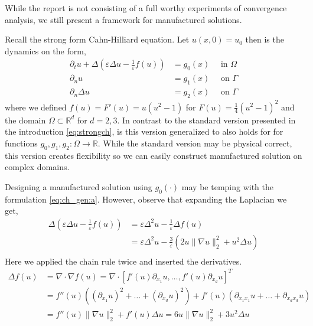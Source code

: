 While the report is not consisting of a full worthy experiments of convergence analysis, we still present a framework for manufactured solutions.

Recall the strong form Cahn-Hilliard equation. Let $ u( x,0) =  u_{0}$ then is the dynamics on the form,
\begin{subequations}
    \label{eq:ch_gen}
    \begin{align}
    \label{eq:ch_gen:a}
        \partial _{t} u + \Delta  \left(  \varepsilon  \Delta u - \frac{1}{\varepsilon }f( u) \right)   &= g_{0}( x)   \quad \text{ in } \Omega  \\
        \partial _{n} u &= g_{1}( x)  \quad \text{ on } \Gamma  \\
        \partial _{n}    \Delta u   &= g_{2}(x)  \quad \text{ on } \Gamma
    \end{align}
\end{subequations}
where we defined $f( u) = F'( u) =u( u^2 -1)  $ for $F( u) = \frac{1}{4}( u^{2} - 1)^{2} $ and the domain $\Omega \subset \mathbb{R} ^{d} $  for $d = 2,3$. In contrast to the standard version presented in the introduction \eqref{eq:strongch}, is this version
generalized to also holds for for functions $g_{0},g_{1},g_{2}: \Omega \to\mathbb{R}   $. While the standard version may be physical correct, this version creates flexibility so we can easily construct manufactured solution on complex domains.

    Designing a manufactured solution using $g_{0}( \cdot ) $ may be temping with the formulation \eqref{eq:ch_gen:a}. However, observe that expanding the Laplacian we get,
    \begin{equation}
    \begin{split}
        \Delta  \left(  \varepsilon  \Delta u - \frac{1}{\varepsilon }f( u) \right) & = \varepsilon \Delta^2 u - \frac{1}{\varepsilon } \Delta f( u) \\
                                                                                    &= \varepsilon \Delta ^2 u  - \frac{3}{\varepsilon }( 2u \| \nabla u \|_{ 2 }^{ 2 } + u^{2}  \Delta u )   \\
    \end{split}
    \end{equation}
Here we applied the chain rule twice and inserted the derivatives.
\begin{equation}
    \label{eq:nonlinear_laplace}
    \begin{split}
\Delta f( u)  &= \nabla \cdot \nabla f( u)  = \nabla \cdot  \left[ f' ( u) \partial _{x_{1}}u, \ldots, f' ( u) \partial _{x_{d}}u \right] ^{T} \\
& =  f'' ( u)( ( \partial _{x_{1}}u )^{2} + \ldots +( \partial _{x_{d}}u )^{2} ) +  f' ( u)( \partial _{x_{1} x_{1}}u + \ldots +   \partial _{x_{d} x_{d}}u ) \\
&=  f'' ( u) \| \nabla u \|_{ 2 }^{ 2 } + f' ( u)  \Delta u  = 6u \| \nabla u \|_{ 2 }^{ 2 } + 3u^{2}  \Delta u
    \end{split}
\end{equation}

